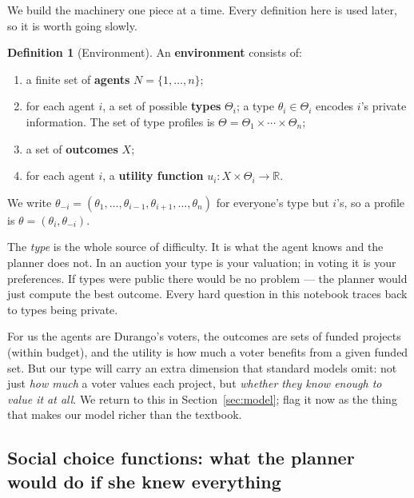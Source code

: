 \documentclass[11pt,letterpaper]{article}
\theoremstyle{definition}
\newtheorem{definition}{Definition}[section]
\theoremstyle{plain}
\theoremstyle{remark}
\newcommand{\R}{\mathbb{R}}
\newcommand{\agents}{N}
\newcommand{\type}{\theta}
\newcommand{\typespace}{\Theta}
\newcommand{\outcomes}{X}
\begin{document}
We build the machinery one piece at a time. Every definition here is used later, so it is
worth going slowly.

\begin{definition}[Environment]
\label{def:environment}
An \textbf{environment} consists of:
\begin{enumerate}[label=(\roman*),nosep]
  \item a finite set of \textbf{agents} $\agents=\{1,\dots,n\}$;
  \item for each agent $i$, a set of possible \textbf{types} $\typespace_i$; a type
        $\type_i\in\typespace_i$ encodes $i$'s private information. The set of type profiles is
        $\typespace=\typespace_1\times\cdots\times\typespace_n$;
  \item a set of \textbf{outcomes} $\outcomes$;
  \item for each agent $i$, a \textbf{utility function} $u_i:\outcomes\times\typespace_i\to\R$.
\end{enumerate}
We write $\type_{-i}=(\type_1,\dots,\type_{i-1},\type_{i+1},\dots,\type_n)$ for everyone's type
but $i$'s, so a profile is $\type=(\type_i,\type_{-i})$.
\end{definition}

\begin{intuition}
The \emph{type} is the whole source of difficulty. It is what the agent knows and the planner
does not. In an auction your type is your valuation; in voting it is your preferences. If types
were public there would be no problem --- the planner would just compute the best outcome. Every
hard question in this notebook traces back to types being private.
\end{intuition}

\begin{connection}
For us the agents are Durango's voters, the outcomes are sets of funded projects (within
budget), and the utility is how much a voter benefits from a given funded set. But our type
will carry an extra dimension that standard models omit: not just \emph{how much} a voter values
each project, but \emph{whether they know enough to value it at all}. We return to this in
Section~\ref{sec:model}; flag it now as the thing that makes our model richer than the textbook.
\end{connection}

\subsection{Social choice functions: what the planner would do if she knew everything}
\end{document}
